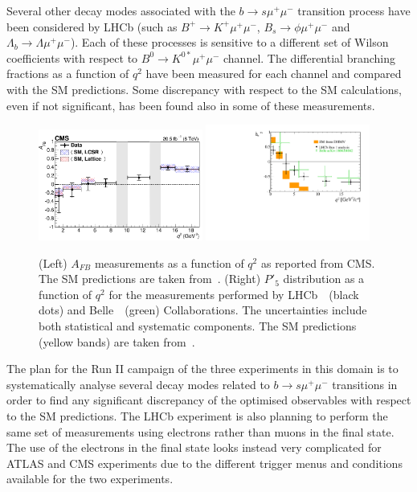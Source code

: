Several other decay modes associated with the $b \to s \mu^+ \mu^-$ transition process have been considered by LHCb (such as $B^+ \to K^{+} \mu^+ \mu^-$, $B_s \to  \phi \mu^+ \mu^-$ and $\Lambda_b \to \Lambda \mu^+ \mu^-$). Each of these processes is sensitive to a different set of Wilson coefficients with respect to $B^0 \to  K^{0*} \mu^+ \mu^-$ channel. The differential branching fractions as a function of $q^2$ have been measured for each channel and compared with the SM predictions. Some discrepancy with respect to the SM calculations, even if not significant, has been found also in some of these measurements.
\begin{figure}[!t]
  \begin{center}
  \includegraphics[width=0.48\textwidth]{AFB_CMS.png}
  \includegraphics[width=0.48\textwidth]{P5p.pdf}
    \caption {(Left) $A_{FB}$ measurements as a function of $q^2$ as reported from CMS. The SM predictions are taken from~\cite{ABSZ,ABSZ2}. (Right) $P'_5$ distribution as a function of $q^2$ for the measurements performed by LHCb~\cite{mumuK_LHCb}~(black dots) and Belle~\cite{Belle}~(green) Collaborations. The uncertainties include both statistical and systematic components. The SM predictions (yellow bands) are taken from~\cite{DHMV}. }
        \label{fig:mumuK}
  \end{center}
\end{figure}

The plan for the Run II campaign of the three experiments in this domain is to systematically analyse several decay modes related to $b \to s \mu^+ \mu^-$  transitions in order to find any significant discrepancy of the optimised observables with respect to the SM predictions. The LHCb experiment is also planning to perform the same set of measurements using electrons rather than muons in the final state. The use of the electrons in the final state looks instead very complicated for ATLAS and CMS experiments due to the different trigger menus and conditions available for the two experiments.

